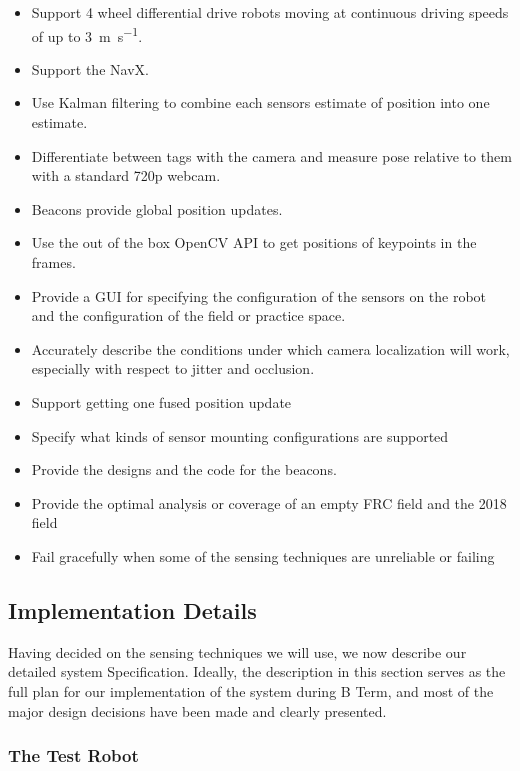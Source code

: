 \documentclass{article}
\begin{document}
    \begin{itemize}
      \item Support 4 wheel differential drive robots moving at continuous driving speeds of up to \SI{3}{\meter\per\second}.
      \item Support the NavX.
      \item Use Kalman filtering to combine each sensors estimate of position into one estimate.
      \item Differentiate between tags with the camera and measure pose relative to them with a standard 720p webcam.
      \item Beacons provide global position updates.
      \item Use the out of the box OpenCV API to get positions of keypoints in the frames.
      \item Provide a GUI for specifying the configuration of the sensors on the robot and the configuration of the field or practice space.
      \item Accurately describe the conditions under which camera localization will work, especially with respect to jitter and occlusion.
      \item Support getting one fused position update
      \item Specify what kinds of sensor mounting configurations are supported
      \item Provide the designs and the code for the beacons.
      \item Provide the optimal analysis or coverage of an empty FRC field and the 2018 field
      \item Fail gracefully when some of the sensing techniques are unreliable or failing
    \end{itemize}

  \subsection{Implementation Details}

    Having decided on the sensing techniques we will use, we now describe our detailed system Specification. Ideally, the description in this section serves as the full plan for our implementation of the system during B Term, and most of the major design decisions have been made and clearly presented.

		\subsubsection{The Test Robot}
\end{document}
